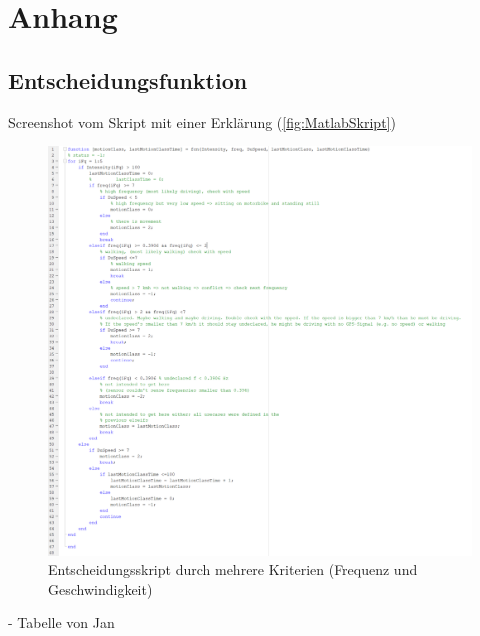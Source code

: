 \chapter{Anhang} \label{chap:Anhang}
\section{Entscheidungsfunktion} \label{Anh:Entscheidungsfunktion}
Screenshot vom Skript mit einer Erklärung (\autoref{fig:MatlabSkript})
\begin{figure}[H]
	\centering
	\includegraphics[width=\linewidth]{Bilder/MatlabSkript.png}
	\caption{Entscheidungsskript durch mehrere Kriterien (Frequenz und Geschwindigkeit)}
	\label{fig:MatlabSkript}
\end{figure}

- Tabelle von Jan
